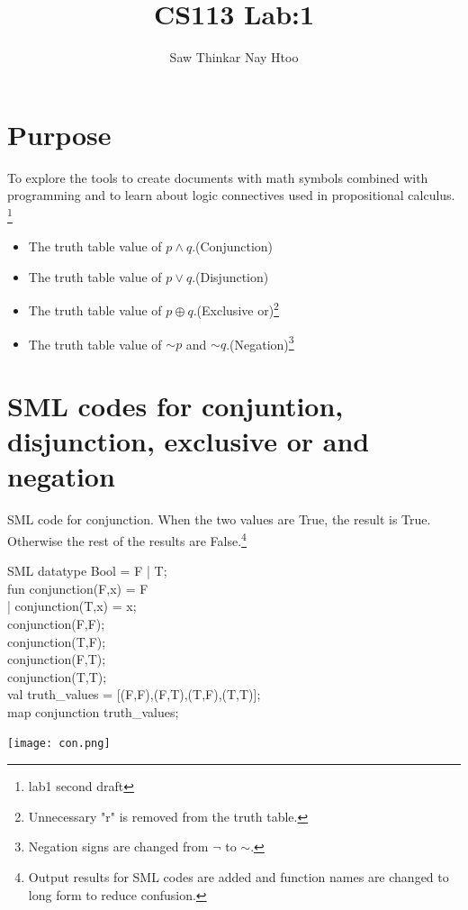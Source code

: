 \documentclass[11pt]{article}
\begin{document}
\title{CS113 Lab:1}
\author{Saw Thinkar Nay Htoo}
\maketitle
\section*{Purpose}
To explore the tools to create documents with math symbols combined with programming and to learn about logic connectives used in propositional calculus. \footnote{lab1 second draft}

\begin{itemize}

\item
The truth table value of $p \land q$.(Conjunction)\\

\clearpage

\item
The truth table value of $p \lor q$.(Disjunction)\\



\item
The truth table value of $p \oplus q$.(Exclusive or)\footnote{Unnecessary "r" is removed from the truth table.}\\


\clearpage

\item
The truth table value of $\sim p$ and $\sim q$.(Negation)\footnote{Negation signs are changed from $\neg$ to $\sim$.}\\



\end{itemize}

\noindent{ \color{red} \rule{\linewidth} {0.5mm} }
\clearpage

\section*{SML codes for conjuntion, disjunction, exclusive or and negation}
SML code for conjunction. When the two values are True, the result is True. Otherwise the rest of the results are False.\footnote{Output results for SML codes are added and function names are changed to long form to reduce confusion.}
\begin{GFT}{SML}
\+datatype Bool = F | T;\\
\+fun conjunction(F,x) = F\\
\+ | conjunction(T,x) = x;\\
\+conjunction(F,F);\\
\+conjunction(T,F);\\
\+conjunction(F,T);\\
\+conjunction(T,T);\\
\+val truth\_values = [(F,F),(F,T),(T,F),(T,T)];\\
\+map conjunction truth\_values;\\
\end{GFT}
\texttt{[image: con.png]}
\clearpage
\end{document}
